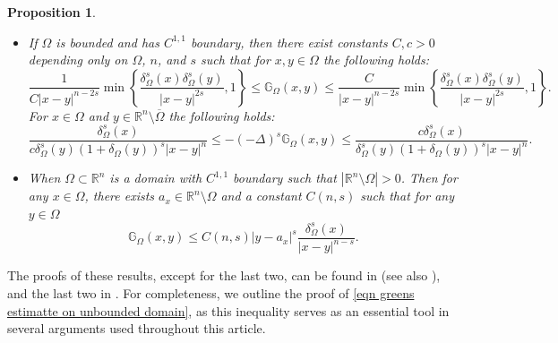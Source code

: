 \documentclass{amsart}
\newtheorem{proposition}[theorem]{Proposition}
\newcommand{\R}{\mathbb{R}}
\newcommand{\slap}{(-\Delta)^{s}}
\newcommand{\gk}[1]{\mathbb{G}_{#1}}
\begin{document}
\begin{proposition}
\begin{itemize}
       \item[(v)] If $\Omega$ is bounded and has $C^{1,1}$ boundary, then there exist  constants $C,c>0$ depending only on $\Omega$, $n$, and $s$ such that for $x,y\in \Omega $ the following holds:
       \begin{equation}\label{eqn behaviour of greens kernel}
           \frac{1}{C|x-y|^{n-2s}}\min\left\{\frac{\delta^{s}_{\Omega}(x)\delta^{s}_{\Omega}(y)}{|x-y|^{2s}},1\right\}\leq \gk{\Omega}(x,y)\leq \frac{C}{|x-y|^{n-2s}}\min\left\{\frac{\delta^{s}_{\Omega}(x)\delta^{s}_{\Omega}(y)}{|x-y|^{2s}},1\right\}.
       \end{equation}
For $x\in \Omega$ and $y\in \R^{n}\setminus\overline{\Omega}$ the following holds:
\begin{equation}\label{asym of poison on bounded domain}
    \frac{\delta_{\Omega}^{s}(x)}{c\delta_{\Omega}^{s}(y)\left(1+\delta_{\Omega}(y)\right)^{s}|x-y|^{n}}\leq -\slap\gk{\Omega}(x,y)\leq \frac{c\delta_{\Omega}^{s}(x)}{\delta_{\Omega}^{s}(y)\left(1+\delta_{\Omega}(y)\right)^{s}|x-y|^{n}}.
\end{equation}
\smallskip 

\item[(vi)] When $\Omega\subset \R^{n}$ is a domain with $C^{1,1}$ boundary such that $|\R^{n}\setminus \Omega|>0$. Then for any $x\in \Omega$, there exists $a_x\in \R^{n}\setminus\Omega$ and a constant $C(n,s)$ such that for any $y\in \Omega$
\begin{equation}\label{eqn greens estimatte on unbounded domain}
    \gk{\Omega}(x,y)\leq C(n,s)|y-a_x|^{s}\frac{\delta_{\Omega}^{s}(x)}{|x-y|^{n-s}}.
\end{equation}
   \end{itemize}
\end{proposition}

The proofs of these results, except for the last two, can be found in  \cite[Lemma 3.2]{Abatangelo2015LargesHarmonic} (see also \cite{Bucur2016, Lankoff1972}), and the last two in \cite[Corollary 1.3, Theorem1.5, Proof of (1.4)]{ChenSong1998}. For completeness, we outline the proof of \eqref{eqn greens estimatte on unbounded domain}, as this inequality serves as an essential tool in several arguments used throughout this article.
\end{document}
